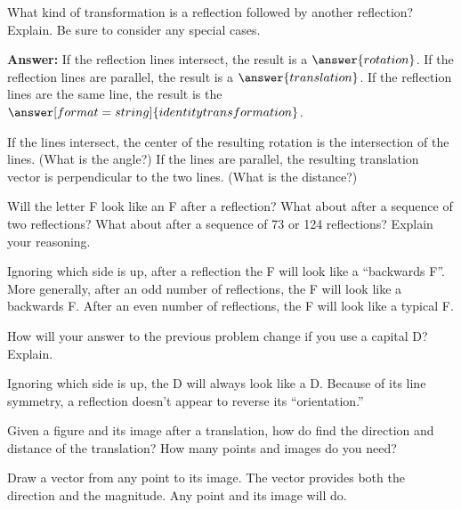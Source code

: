 \documentclass[nooutcomes]{ximera}
\begin{document}
\begin{question}
What kind of transformation is a reflection followed by another reflection?  Explain.  Be sure to consider any special cases.  

\textbf{Answer:} If the reflection lines intersect, the result is a $\answer{rotation}$.  If the reflection lines are parallel, the result is a $\answer{translation}$. If the reflection lines are the same line, the result is the $\answer[format=string]{identity transformation}$.
\begin{feedback}[correct]
If the lines intersect, the center of the resulting rotation is the intersection of the lines.  (What is the angle?) If the lines are parallel, the resulting translation vector is perpendicular to the two lines. (What is the distance?)
\end{feedback}
\end{question}

\begin{question}
Will the letter F look like an F after a reflection?  What about after a sequence of two reflections?  What about after a sequence of 73 or 124 reflections?  Explain your reasoning.  
\begin{freeResponse}
\begin{hint}
Ignoring which side is up, after a reflection the F will look like a ``backwards F''.  More generally, after an odd number of reflections, the F will look like a backwards F.  After an even number of reflections, the F will look like a typical F.  
\end{hint}
\end{freeResponse}
\end{question}

\begin{question}
How will your answer to the previous problem change if you use a capital D?  Explain.  
\begin{freeResponse}
\begin{hint}
Ignoring which side is up, the D will always look like a D.  Because of its line symmetry, a reflection doesn't appear to reverse its ``orientation.''  
\end{hint}
\end{freeResponse}
\end{question}

\begin{question}
Given a figure and its image after a translation, how do find the direction and distance of the translation?    How many points and images do you need?  
\begin{freeResponse}
\begin{hint}
Draw a vector from any point to its image.  The vector provides both the direction and the magnitude.  Any point and its image will do.  
\end{hint}
\end{freeResponse}
\end{question}
\end{document}
